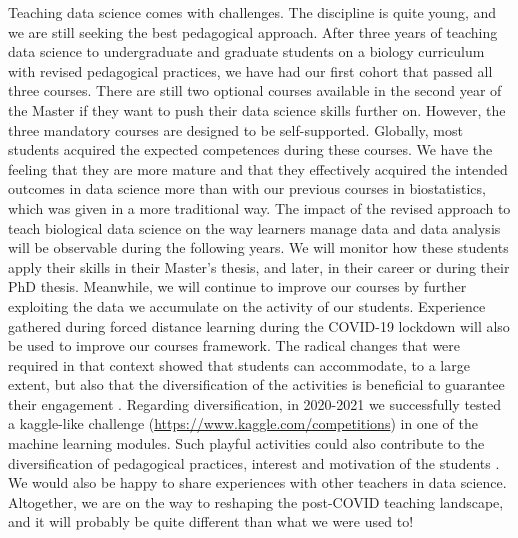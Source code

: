 \documentclass{aims} %
\theoremstyle{definition}
\begin{document}
Teaching data science comes with challenges. The discipline is quite
young, and we are still seeking the best pedagogical approach. After
three years of teaching data science to undergraduate and graduate
students on a biology curriculum with revised pedagogical practices, we
have had our first cohort that passed all three courses. There are still
two optional courses available in the second year of the Master if they
want to push their data science skills further on. However, the three
mandatory courses are designed to be self-supported. Globally, most
students acquired the expected competences during these courses. We have
the feeling that they are more mature and that they effectively acquired
the intended outcomes in data science more than with our previous
courses in biostatistics, which was given in a more traditional way. The
impact of the revised approach to teach biological data science on the
way learners manage data and data analysis will be observable during the
following years. We will monitor how these students apply their skills
in their Master's thesis, and later, in their career or during their PhD
thesis. Meanwhile, we will continue to improve our courses by further
exploiting the data we accumulate on the activity of our students.
Experience gathered during forced distance learning during the COVID-19
lockdown will also be used to improve our courses framework. The radical
changes that were required in that context showed that students can
accommodate, to a large extent, but also that the diversification of the
activities is beneficial to guarantee their engagement
\cite{Spadafora2018, Young2002}. Regarding diversification, in 2020-2021
we successfully tested a kaggle-like challenge
(\url{https://www.kaggle.com/competitions}) in one of the machine
learning modules. Such playful activities could also contribute to the
diversification of pedagogical practices, interest and motivation of the
students \cite{Alonso2019}. We would also be happy to share experiences
with other teachers in data science. Altogether, we are on the way to
reshaping the post-COVID teaching landscape, and it will probably be
quite different than what we were used to!



\end{document}
